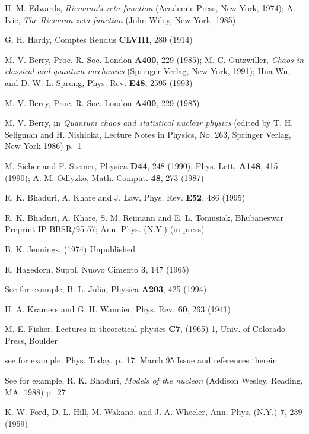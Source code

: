 \documentclass[11pt]{article}
\theoremstyle{plain}
\begin{document}
\begin{thebibliography}{21}
 H. M. Edwards, \textit{Riemann's zeta function} (Academic Press, New York, 1974); A. Ivic, \textit{The Riemann zeta function} (John Wiley, New York, 1985)

 G. H. Hardy, Comptes Rendus \textbf{CLVIII}, 280 (1914)

 M. V. Berry, Proc. R. Soc. London \textbf{A400}, 229 (1985); M. C. Gutzwiller, \textit{Chaos in classical and quantum mechanics} (Springer Verlag, New York, 1991); Hua Wu, and D. W. L. Sprung, Phys. Rev. \textbf{E48}, 2595 (1993)

 M. V. Berry, Proc. R. Soc. London \textbf{A400}, 229 (1985)

 M. V. Berry, in \textit{Quantum chaos and statistical nuclear physics} (edited by T. H. Seligman and H. Nishioka, Lecture Notes in Physics, No. 263, Springer Verlag, New York 1986) p.~1

 M. Sieber and F. Steiner, Physica \textbf{D44}, 248 (1990); Phys. Lett. \textbf{A148}, 415 (1990); A. M. Odlyzko, Math. Comput. \textbf{48}, 273 (1987)

 R. K. Bhaduri, A. Khare and J. Law, Phys. Rev. \textbf{E52}, 486 (1995)

 R. K. Bhaduri, A. Khare, S. M. Reimann and E. L. Tomusiak, Bhubaneswar Preprint IP-BBSR/95-57; Ann. Phys. (N.Y.) (in press)

 B. K. Jennings, (1974) Unpublished

 R. Hagedorn, Suppl. Nuovo Cimento \textbf{3}, 147 (1965)

 See for example, B. L. Julia, Physica \textbf{A203}, 425 (1994)

 H. A. Kramers and G. H. Wannier, Phys. Rev. \textbf{60}, 263 (1941)

 M. E. Fisher, Lectures in theoretical physics \textbf{C7}, (1965) 1, Univ. of Colorado Press, Boulder

 see for example, Phys. Today, p.~17, March 95 Issue and references therein

 See for example, R. K. Bhaduri, \textit{Models of the nucleon} (Addison Wesley, Reading, MA, 1988) p.~27

 K. W. Ford, D. L. Hill, M. Wakano, and J. A. Wheeler, Ann. Phys. (N.Y.) \textbf{7}, 239 (1959)


\end{thebibliography}
\end{document}

